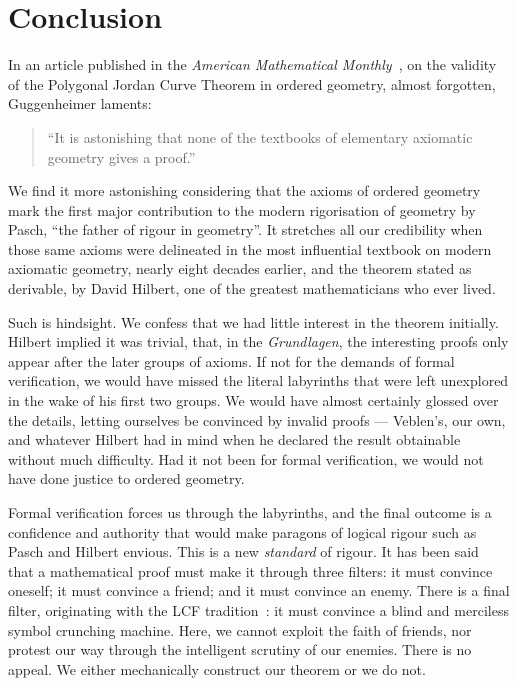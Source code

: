 \chapter{Conclusion}\label{chapter:Conclusion}
In an article published in the \emph{American Mathematical Monthly}~\cite{GuggenheimerJordanProof}, on the validity of the Polygonal Jordan Curve Theorem in ordered geometry, almost forgotten, Guggenheimer laments:
\begin{quotation}
  ``It is astonishing that none of the textbooks of elementary axiomatic geometry gives a proof.''
\end{quotation}

We find it more astonishing considering that the axioms of ordered geometry mark the first major contribution to the modern rigorisation of geometry by Pasch, ``the father of rigour in geometry''. It stretches all our credibility when those same axioms were delineated in the most influential textbook on modern axiomatic geometry, nearly eight decades earlier,  and the theorem stated as derivable, by David Hilbert, one of the greatest mathematicians who ever lived.

Such is hindsight. We confess that we had little interest in the theorem initially. Hilbert implied it was trivial, that, in the \emph{Grundlagen}, the interesting proofs only appear after the later groups of axioms. If not for the demands of formal verification, we would have missed the literal labyrinths that were left unexplored in the wake of his first two groups. We would have almost certainly glossed over the details, letting ourselves be convinced by invalid proofs --- Veblen's, our own, and whatever Hilbert had in mind when he declared the result obtainable without much difficulty. Had it not been for formal verification, we would not have done justice to ordered geometry.

Formal verification forces us through the labyrinths, and the final outcome is a confidence and authority that would make paragons of logical rigour such as Pasch and Hilbert envious. This is a new \emph{standard} of rigour. It has been said~\cite{ConvinceEnemy} that a mathematical proof must make it through three filters: it must convince oneself; it must convince a friend; and it must convince an enemy. There is a final filter, originating with the LCF tradition~\cite{LCF}: it must convince a blind and merciless symbol crunching machine. Here, we cannot exploit the faith of friends, nor protest our way through the intelligent scrutiny of our enemies. There is no appeal. We either mechanically construct our theorem or we do not.

